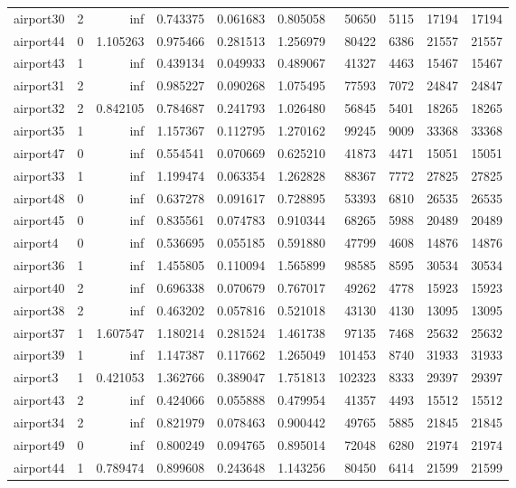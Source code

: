 \begin{longtable}{|l|r|r|r|r|r|r|r|r|r|}
airport30 & 2 & inf & 0.743375 & 0.061683 & 0.805058 & 50650 & 5115 & 17194 & 17194 \\
airport44 & 0 & 1.105263 & 0.975466 & 0.281513 & 1.256979 & 80422 & 6386 & 21557 & 21557 \\
airport43 & 1 & inf & 0.439134 & 0.049933 & 0.489067 & 41327 & 4463 & 15467 & 15467 \\
airport31 & 2 & inf & 0.985227 & 0.090268 & 1.075495 & 77593 & 7072 & 24847 & 24847 \\
airport32 & 2 & 0.842105 & 0.784687 & 0.241793 & 1.026480 & 56845 & 5401 & 18265 & 18265 \\
airport35 & 1 & inf & 1.157367 & 0.112795 & 1.270162 & 99245 & 9009 & 33368 & 33368 \\
airport47 & 0 & inf & 0.554541 & 0.070669 & 0.625210 & 41873 & 4471 & 15051 & 15051 \\
airport33 & 1 & inf & 1.199474 & 0.063354 & 1.262828 & 88367 & 7772 & 27825 & 27825 \\
airport48 & 0 & inf & 0.637278 & 0.091617 & 0.728895 & 53393 & 6810 & 26535 & 26535 \\
airport45 & 0 & inf & 0.835561 & 0.074783 & 0.910344 & 68265 & 5988 & 20489 & 20489 \\
airport4 & 0 & inf & 0.536695 & 0.055185 & 0.591880 & 47799 & 4608 & 14876 & 14876 \\
airport36 & 1 & inf & 1.455805 & 0.110094 & 1.565899 & 98585 & 8595 & 30534 & 30534 \\
airport40 & 2 & inf & 0.696338 & 0.070679 & 0.767017 & 49262 & 4778 & 15923 & 15923 \\
airport38 & 2 & inf & 0.463202 & 0.057816 & 0.521018 & 43130 & 4130 & 13095 & 13095 \\
airport37 & 1 & 1.607547 & 1.180214 & 0.281524 & 1.461738 & 97135 & 7468 & 25632 & 25632 \\
airport39 & 1 & inf & 1.147387 & 0.117662 & 1.265049 & 101453 & 8740 & 31933 & 31933 \\
airport3 & 1 & 0.421053 & 1.362766 & 0.389047 & 1.751813 & 102323 & 8333 & 29397 & 29397 \\
airport43 & 2 & inf & 0.424066 & 0.055888 & 0.479954 & 41357 & 4493 & 15512 & 15512 \\
airport34 & 2 & inf & 0.821979 & 0.078463 & 0.900442 & 49765 & 5885 & 21845 & 21845 \\
airport49 & 0 & inf & 0.800249 & 0.094765 & 0.895014 & 72048 & 6280 & 21974 & 21974 \\
airport44 & 1 & 0.789474 & 0.899608 & 0.243648 & 1.143256 & 80450 & 6414 & 21599 & 21599 \\

\end{longtable}
